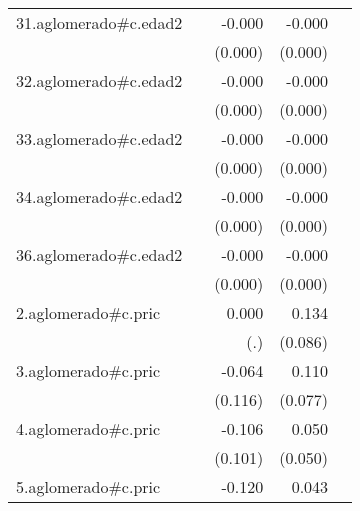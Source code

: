 {\begin{longtable}{l*{4}{D{.}{.}{-1}}}
\addlinespace
31.aglomerado#c.edad2&                     &      -0.000         &      -0.000\sym{***}&                     \\
            &                     &     (0.000)         &     (0.000)         &                     \\
\addlinespace
32.aglomerado#c.edad2&                     &      -0.000         &      -0.000\sym{***}&                     \\
            &                     &     (0.000)         &     (0.000)         &                     \\
\addlinespace
33.aglomerado#c.edad2&                     &      -0.000         &      -0.000\sym{**} &                     \\
            &                     &     (0.000)         &     (0.000)         &                     \\
\addlinespace
34.aglomerado#c.edad2&                     &      -0.000         &      -0.000\sym{*}  &                     \\
            &                     &     (0.000)         &     (0.000)         &                     \\
\addlinespace
36.aglomerado#c.edad2&                     &      -0.000         &      -0.000\sym{**} &                     \\
            &                     &     (0.000)         &     (0.000)         &                     \\
\addlinespace
2.aglomerado#c.pric&                     &       0.000         &       0.134         &                     \\
            &                     &         (.)         &     (0.086)         &                     \\
\addlinespace
3.aglomerado#c.pric&                     &      -0.064         &       0.110         &                     \\
            &                     &     (0.116)         &     (0.077)         &                     \\
\addlinespace
4.aglomerado#c.pric&                     &      -0.106         &       0.050         &                     \\
            &                     &     (0.101)         &     (0.050)         &                     \\
\addlinespace
5.aglomerado#c.pric&                     &      -0.120         &       0.043         &                     \\

\end{longtable}}
